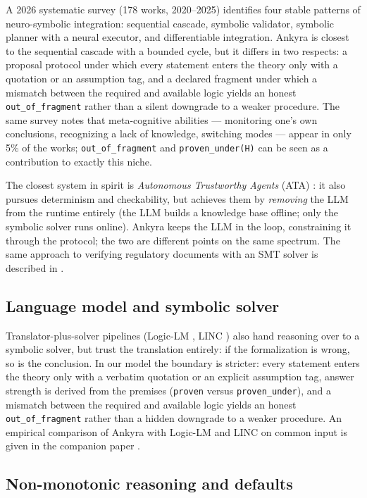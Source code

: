 \documentclass[12pt,a4paper]{article}
\begin{document}
A 2026 systematic survey \cite{survey2026} (178 works, 2020--2025) identifies
four stable patterns of neuro-symbolic integration: sequential cascade,
symbolic validator, symbolic planner with a neural executor, and
differentiable integration. Ankyra is closest to the sequential cascade with a
bounded cycle, but it differs in two respects: a proposal protocol under which
every statement enters the theory only with a quotation or an assumption tag,
and a declared fragment under which a mismatch between the required and
available logic yields an honest \texttt{out\_of\_fragment} rather than a
silent downgrade to a weaker procedure. The same survey notes that
meta-cognitive abilities --- monitoring one's own conclusions, recognizing a
lack of knowledge, switching modes --- appear in only 5\% of the works;
\texttt{out\_of\_fragment} and \texttt{proven\_under(H)} can be seen as a
contribution to exactly this niche.

The closest system in spirit is \emph{Autonomous Trustworthy Agents} (ATA)
\cite{ata}: it also pursues determinism and checkability, but achieves them by
\emph{removing} the LLM from the runtime entirely (the LLM builds a knowledge
base offline; only the symbolic solver runs online). Ankyra keeps the LLM in
the loop, constraining it through the protocol; the two are different points
on the same spectrum. The same approach to verifying regulatory documents with
an SMT solver is described in \cite{nsc}.

\subsection{Language model and symbolic solver}
\label{sec:translator_solver}

Translator-plus-solver pipelines (Logic-LM \cite{logiclm}, LINC \cite{linc})
also hand reasoning over to a symbolic solver, but trust the translation
entirely: if the formalization is wrong, so is the conclusion. In our model
the boundary is stricter: every statement enters the theory only with a
verbatim quotation or an explicit assumption tag, answer strength is derived
from the premises (\texttt{proven} versus \texttt{proven\_under}), and a
mismatch between the required and available logic yields an honest
\texttt{out\_of\_fragment} rather than a hidden downgrade to a weaker
procedure. An empirical comparison of Ankyra with Logic-LM and LINC on common
input is given in the companion paper \cite{ankyra_paper}.

\subsection{Non-monotonic reasoning and defaults}
\label{sec:nonmono_related}
\end{document}
